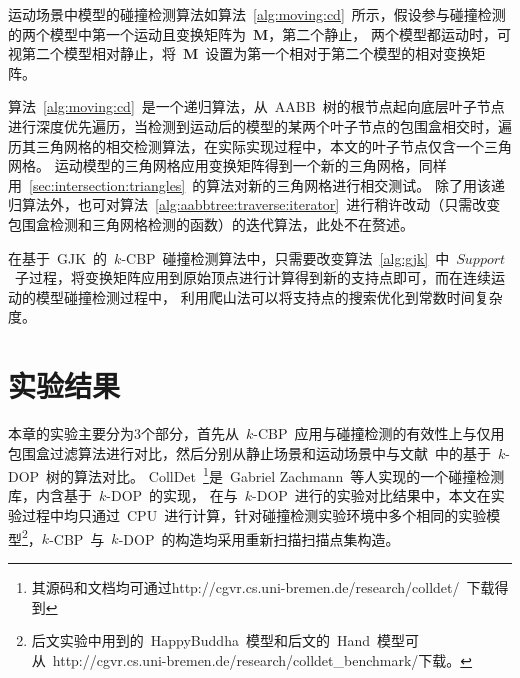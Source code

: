 \begin{algorithm}[H]
\end{algorithm}

运动场景中模型的碰撞检测算法如算法~\ref{alg:moving:cd}~所示，假设参与碰撞检测的两个模型中第一个运动且变换矩阵为~$\bm{M}$，第二个静止，
两个模型都运动时，可视第二个模型相对静止，将~$\bm{M}$~设置为第一个相对于第二个模型的相对变换矩阵。

算法~\ref{alg:moving:cd}~是一个递归算法，从~AABB~树的根节点起向底层叶子节点进行深度优先遍历，当检测到运动后的模型的某两个叶子节点的包围盒相交时，遍历其三角网格的相交检测算法，在实际实现过程中，本文的叶子节点仅含一个三角网格。
运动模型的三角网格应用变换矩阵得到一个新的三角网格，同样用~\ref{sec:intersection:triangles}~的算法对新的三角网格进行相交测试。
除了用该递归算法外，也可对算法~\ref{alg:aabbtree:traverse:iterator}~进行稍许改动（只需改变包围盒检测和三角网格检测的函数）的迭代算法，此处不在赘述。

在基于~GJK~的~$k$-CBP~碰撞检测算法中，只需要改变算法~\ref{alg:gjk}~中~$Support$~子过程，将变换矩阵应用到原始顶点进行计算得到新的支持点即可，而在连续运动的模型碰撞检测过程中，
利用爬山法可以将支持点的搜索优化到常数时间复杂度\cite{bergen1999fast}。


\section{实验结果}
\label{sec:exper-cd}
本章的实验主要分为3个部分，首先从~$k$-CBP~应用与碰撞检测的有效性上与仅用包围盒过滤算法进行对比，然后分别从静止场景和运动场景中与文献~中的基于~$k$-DOP~树的算法对比。
CollDet~\footnote{其源码和文档均可通过http://cgvr.cs.uni-bremen.de/research/colldet/~下载得到}是~Gabriel Zachmann~等人实现的一个碰撞检测库\cite{abenchmarking2007}，内含基于~$k$-DOP~的实现，
在与~$k$-DOP~进行的实验对比结果中，本文在实验过程中均只通过~CPU~进行计算，针对碰撞检测实验环境中多个相同的实验模型\footnote{后文实验中用到的~HappyBuddha~模型和后文的~Hand~模型可从~http://cgvr.cs.uni-bremen.de/research/colldet\_benchmark/下载。}，$k$-CBP~与~$k$-DOP~的构造均采用重新扫描扫描点集构造。

